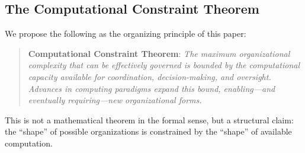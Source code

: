 \documentclass[11pt,a4paper,twocolumn]{article}
\begin{document}
\subsection{The Computational Constraint Theorem}

We propose the following as the organizing principle of this paper:

\begin{quote}
\textbf{Computational Constraint Theorem}: \textit{The maximum organizational complexity that can be effectively governed is bounded by the computational capacity available for coordination, decision-making, and oversight. Advances in computing paradigms expand this bound, enabling---and eventually requiring---new organizational forms.}
\end{quote}

This is not a mathematical theorem in the formal sense, but a structural claim: the ``shape'' of possible organizations is constrained by the ``shape'' of available computation.
\end{document}
